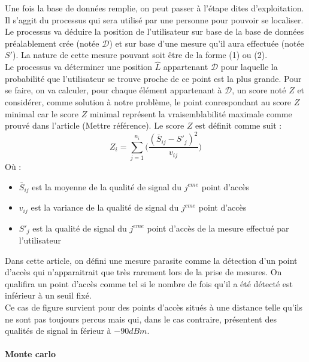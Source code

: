 \documentclass[11pt,journal,compsoc]{IEEEtran}
\begin{document}
        Une fois la base de données remplie, on peut passer à l'étape dites d'exploitation. Il s'aggit du processus qui sera utilisé par une personne pour pouvoir se localiser.\\
        Le processus va déduire la position de l'utilisateur sur base de la base de données préalablement crée (notée $\mathcal{D}$) et sur base d'une mesure qu'il aura effectuée (notée $S'$). La nature de cette mesure pouvant soit être de la forme (1) ou (2).\\
        Le processus va déterminer une position $\hat{L}$ appartenant $\mathcal{D}$ pour laquelle la probabilité que l'utilisateur se trouve proche de ce point est la plus grande. Pour se faire, on va calculer, pour chaque élément appartenant à $\mathcal{D}$, un score noté $Z$ et considérer, comme solution à notre problème, le point conrespondant au score $Z$ minimal car le score $Z$ minimal représent la vraisemblabilité maximale comme prouvé dans l'article (Mettre référence). Le score $Z$ est définit comme suit :
        \begin{equation}
          Z_{i} = \sum\limits_{j = 1}^{n_{i}}\bigg(\frac{(\bar{S}_{ij}-S'_{j})^{2}}{v_{ij}}\bigg)
        \end{equation}
        Où :
        \begin{itemize}
          \item $\bar{S}_{ij}$ est la moyenne de la qualité de signal du $j^{eme}$ point d'accès
          \item $v_{ij}$ est la variance de la qualité de signal du $j^{eme}$ point d'accès
          \item $S'_{j}$ est la qualité de signal du $j^{eme}$ point d'accès de la mesure effectué par l'utilisateur
        \end{itemize}
        
        \begin{tcolorbox}[title = Mesures parasites]
          Dans cette article, on défini une mesure parasite comme la détection d'un point d'accès qui n'apparaitrait que très rarement lors de la prise de mesures. On qualifira un point d'accès comme tel si le nombre de fois qu'il a été détecté est inférieur à un seuil fixé.
          \\
          Ce cas de figure survient pour des points d'accès situés à une distance telle qu'ils ne sont pas toujours percus mais qui, dans le cas contraire, présentent des qualités de signal in férieur à $-90 dBm$.
        \end{tcolorbox}
      \paragraph{Monte carlo}
\end{document}

